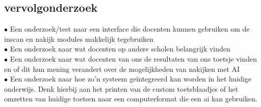 \documentclass[12pt]{article}
\begin{document}
\begin{multicols}{2}
\begin{minipage}{\linewidth}
\subsection{vervolgonderzoek}
$\bullet$ Een onderzoek/test naar een interface die docenten kunnen gebruiken om de inscan en nakijk modules makkelijk tegebruiken\\
$\bullet$ Een onderzoek naar wat docenten op andere scholen belangrijk vinden\\
$\bullet$ Een onderzoek naar wat docenten van ons de resultaten van ons toetsje vinden en of dit hun mening verandert over de mogelijkheden van nakijken met AI\\
$\bullet$ Een onderzoek naar hoe zo'n systeem geïntegreerd kan worden in het huidige onderwijs. Denk hierbij aan het printen van de custom toetsblaadjes of het omzetten van huidige toetsen naar een computerformat  die een ai kan gebruiken.\\
\end{minipage}
\end{multicols}
\pagebreak
\end{document}
